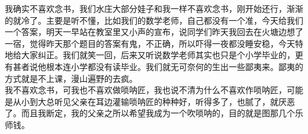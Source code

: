 我确实不喜欢念书，我们水庄大部分娃子和我一样不喜欢念书，刚开始还行，渐渐的就冷了。主要是听不懂，比如我们的数学老师，自己都没有一个准，今天给我们一个答案，明天一早站在教室里又小声的宣布，说同学们昨天我回去在火塘边想了一宿，觉得昨天那个题目的答案有鬼，不正确，所以吓得一夜都没睡安稳，今天特地给大家纠正。我们就笑一回，后来又听说数学老师其实也只是个小学毕业的，更有甚者说他根本连小学都没有读毕业。我们就无可奈何的生出一些鄙夷来。鄙夷的方式就是不上课，漫山遍野的去疯。
\\

我不喜欢念书，可我也不喜欢做唢呐匠，我也说不清为什么不喜欢作唢呐匠，可能是从小到大总听见父亲在耳边灌输唢呐匠的种种好，听得多了，也腻了，就厌恶了。而且我断定，我的父亲之所以希望我成为一个吹唢呐的，目的就是图那几个乐师钱。
\\